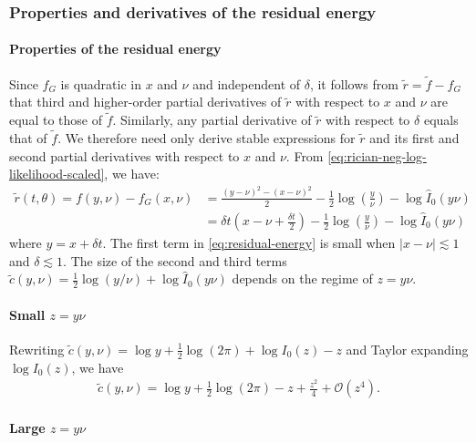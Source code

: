 \documentclass{article}
\begin{document}
\subsubsection{Properties and derivatives of the residual energy}\label{sec:residual-energy-properties-and-derivatives}

\paragraph{Properties of the residual energy}

Since $f_G$ is quadratic in $x$ and $\nu$ and independent of $\delta$, it follows from $\tilde{r} = \tilde{f} - f_G$ that third and higher-order partial derivatives of $\tilde{r}$ with respect to $x$ and $\nu$ are equal to those of $\tilde{f}$.
Similarly, any partial derivative of $\tilde{r}$ with respect to $\delta$ equals that of $\tilde{f}$.
We therefore need only derive stable expressions for $\tilde{r}$ and its first and second partial derivatives with respect to $x$ and $\nu$.
From \cref{eq:rician-neg-log-likelihood-scaled}, we have:
%
\begin{align}
  \tilde{r}(t,\theta) = f(y, \nu) - f_G(x,\nu) & = \frac{(y-\nu)^2 - (x-\nu)^2}{2} - \frac{1}{2}\log\left(\frac{y}{\nu}\right) - \log \hat{I}_0(y \nu)                                               \\
                                               & = \delta t \left(x - \nu + \frac{\delta t}{2}\right) - \frac{1}{2}\log\left(\frac{y}{\nu}\right) - \log \hat{I}_0(y \nu) \label{eq:residual-energy}
\end{align}
%
where $y = x + \delta t$.
The first term in \cref{eq:residual-energy} is small when $|x-\nu| \lesssim 1$ and $\delta \lesssim 1$.
The size of the second and third terms $\tilde{c}(y,\nu) = \frac{1}{2}\log(y/\nu) + \log\hat{I}_0(y\nu)$ depends on the regime of $z=y\nu$.

\paragraph{Small $z=y\nu$}

Rewriting $\tilde{c}(y,\nu) = \log y + \frac{1}{2}\log(2\pi) + \log I_0(z) - z$ and Taylor expanding $\log I_0(z)$, we have
%
\begin{align}\label{eq:c-small-z}
  \tilde{c}(y,\nu) = \log y + \frac{1}{2}\log(2\pi) - z + \frac{z^2}{4} + \mathcal{O}(z^4).
\end{align}

\paragraph{Large $z=y\nu$}
\end{document}
